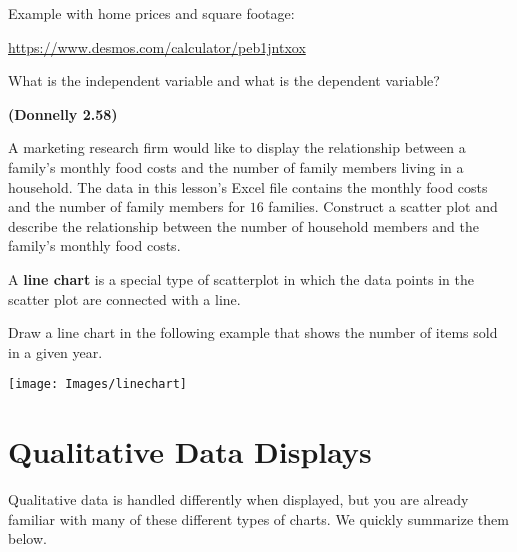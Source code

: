 \documentclass[12pt, letterpaper]{article}
\newcounter{exercise}
\newcounter{visualconnection}
\theoremstyle{definition}
\begin{document}
\begin{visualconnection}
Example with home prices and square footage:
\vspace*{.2in}

\href{https://www.desmos.com/calculator/peb1jntxox}{https://www.desmos.com/calculator/peb1jntxox}

\vspace*{.2in}

What is the independent variable and what is the dependent variable?
\end{visualconnection}

\vspace*{1in}

\begin{exercise} \textbf{(Donnelly 2.58)}

A marketing research firm would like to display the relationship between a family's monthly food costs and the number of family members living in a household.  The data in this lesson's Excel file contains the monthly food costs and the number of family members for $16$ families.  Construct a scatter plot and describe the relationship between the number of household members and the family's monthly food costs.

\end{exercise}

\vfill

\newpage

\begin{defn}
A \textbf{line chart} is a special type of scatterplot in which the data points in the scatter plot are connected with a line.
\end{defn}


\begin{exercise}
Draw a line chart in the following example that shows the number of items sold in a given year.

\begin{center}
\texttt{[image: Images/linechart]}
\end{center}
\end{exercise}


\section*{Qualitative Data Displays}

Qualitative data is handled differently when displayed, but you are already familiar with many of these different types of charts.  We quickly summarize them below.
\end{document}

